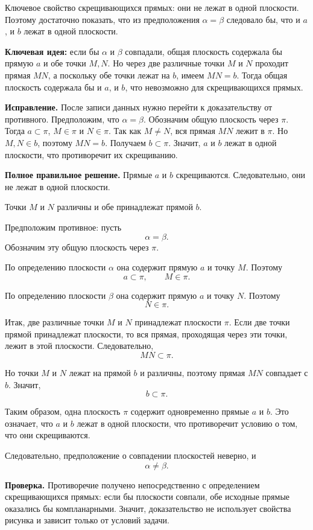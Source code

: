 \documentclass[12pt,a4paper]{article}
\begin{document}
Ключевое свойство скрещивающихся прямых: они не лежат в одной плоскости. Поэтому достаточно показать, что из предположения $\alpha=\beta$ следовало бы, что и $a$, и $b$ лежат в одной плоскости.

\textcolor{blue!60!black}{\textbf{Ключевая идея:}} если бы $\alpha$ и $\beta$ совпадали, общая плоскость содержала бы прямую $a$ и обе точки $M,N$. Но через две различные точки $M$ и $N$ проходит прямая $MN$, а поскольку обе точки лежат на $b$, имеем $MN=b$. Тогда общая плоскость содержала бы и $a$, и $b$, что невозможно для скрещивающихся прямых.

\textbf{Исправление.}
После записи данных нужно перейти к доказательству от противного. Предположим, что $\alpha=\beta$. Обозначим общую плоскость через $\pi$. Тогда $a\subset\pi$, $M\in\pi$ и $N\in\pi$. Так как $M\ne N$, вся прямая $MN$ лежит в $\pi$. Но $M,N\in b$, поэтому $MN=b$. Получаем $b\subset\pi$. Значит, $a$ и $b$ лежат в одной плоскости, что противоречит их скрещиванию.

\textbf{Полное правильное решение.}
Прямые $a$ и $b$ скрещиваются. Следовательно, они не лежат в одной плоскости.

Точки $M$ и $N$ различны и обе принадлежат прямой $b$.

Предположим противное: пусть
\[
\alpha=\beta.
\]
Обозначим эту общую плоскость через $\pi$.

По определению плоскости $\alpha$ она содержит прямую $a$ и точку $M$. Поэтому
\[
a\subset\pi,\qquad M\in\pi.
\]

По определению плоскости $\beta$ она содержит прямую $a$ и точку $N$. Поэтому
\[
N\in\pi.
\]

Итак, две различные точки $M$ и $N$ принадлежат плоскости $\pi$. Если две точки прямой принадлежат плоскости, то вся прямая, проходящая через эти точки, лежит в этой плоскости. Следовательно,
\[
MN\subset\pi.
\]

Но точки $M$ и $N$ лежат на прямой $b$ и различны, поэтому прямая $MN$ совпадает с $b$. Значит,
\[
b\subset\pi.
\]

Таким образом, одна плоскость $\pi$ содержит одновременно прямые $a$ и $b$. Это означает, что $a$ и $b$ лежат в одной плоскости, что противоречит условию о том, что они скрещиваются.

Следовательно, предположение о совпадении плоскостей неверно, и
\[
\alpha\ne\beta.
\]

\textbf{Проверка.}
Противоречие получено непосредственно с определением скрещивающихся прямых: если бы плоскости совпали, обе исходные прямые оказались бы компланарными. Значит, доказательство не использует свойства рисунка и зависит только от условий задачи.
\end{document}
